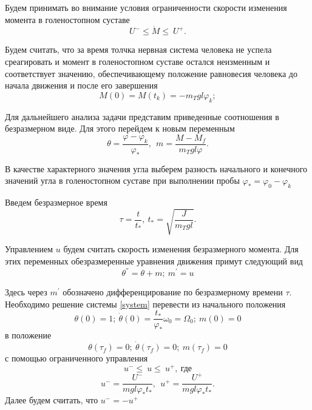 \documentclass[a4paper,14pt]{article}
\theoremstyle{plain} %
\theoremstyle{definition} %
\theoremstyle{remark} %
\begin{document}
{Будем принимать во внимание условия ограниченности скорости изменения
момента в голеностопном суставе
\[
    U^-\le\dot{M}\le\ U^+.
\]

Будем считать, что за время толчка нервная система человека
не успела среагировать и момент в голеностопном суставе остался
неизменным и соответствует значению, обеспечивающему положение
равновесия человека до начала движения и после его завершения
\[
    M(0)=M\left(t_k\right)=-m_Tgl\varphi_k;
\]

Для дальнейшего анализа задачи представим приведенные
соотношения в безразмерном виде. Для этого перейдем
к новым переменным
\[
    \theta=\frac{\varphi-\varphi_k}{\varphi_\ast},\ \ m=\frac{M-M_f}{m_Tgl\varphi}.
\]

В качестве характерного значения угла выберем разность
начального и конечного значений угла в голеностопном
суставе при выполнении пробы $\varphi_\ast=\varphi_0-\varphi_k$

Введем безразмерное время
\[
    \tau=\frac{t}{t_\ast},\ t_\ast=\sqrt{\frac{J}{m_Tgl}}.
\]

Управлением $u$ будем считать скорость изменения безразмерного
момента. Для этих переменных обезразмеренные уравнения движения
примут следующий вид
\begin{equation}\label{system}
    \theta^{''}=\theta+m;\ m^{'}=u
\end{equation}

Здесь через $m^{'}$ обозначено дифференцирование по
безразмерному времени $\tau$. Необходимо решение системы \eqref{system}
перевести из начального положения
\[
    \theta(0)=1;\ \dot{\theta}(0)=\frac{t_\ast}{\varphi_\ast}\omega_0=\Omega_0;\ m(0)=0
\]
в положение
\[
    \theta(\tau_f)=0;\ \dot{\theta}(\tau_f)=0;\ m(\tau_f)=0
\]
с помощью ограниченного управления
\[
    u^-\le\ u\le\ u^+,\ \text{где}
\]
\[
    u^-=\frac{U^-}{mgl\varphi_\ast t_\ast},\ \ u^+=\frac{U^+}{mgl\varphi_\ast t_\ast}.
\]
Далее будем считать, что $u^-=-u^+$
\newpage
}
\end{document}
